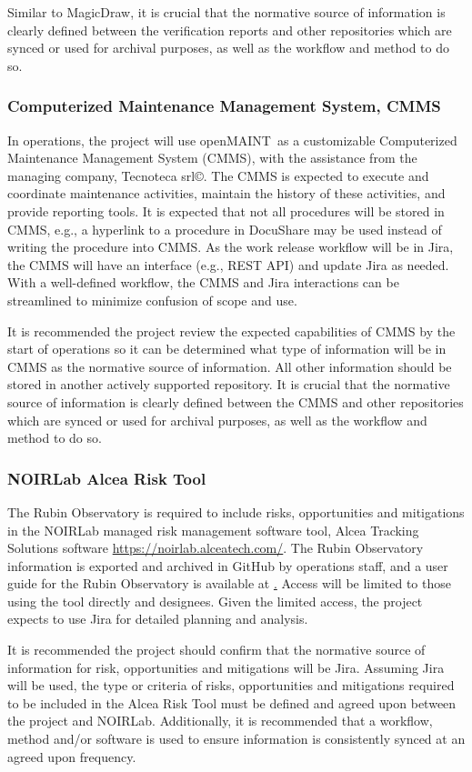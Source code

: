 Similar to MagicDraw, it is crucial that the normative source of information is clearly defined between the verification reports and other repositories which are synced or used for archival purposes, as well as the workflow and method to do so.

\subsubsection{Computerized Maintenance Management System, CMMS}

In operations, the project will use openMAINT\textregistered\ as a customizable Computerized Maintenance Management System (CMMS), with the assistance from the managing company, Tecnoteca srl\copyright . \citep{openmaint-cite}
The CMMS is expected to execute and coordinate maintenance activities, maintain the history of these activities, and provide reporting tools.
It is expected that not all procedures will be stored in CMMS, e.g., a hyperlink to a procedure in DocuShare may be used instead of writing the procedure into CMMS.
As the work release workflow will be in Jira, the CMMS will have an interface (e.g., REST API) and update Jira as needed.
With a well-defined workflow, the CMMS and Jira interactions can be streamlined to minimize confusion of scope and use.

It is recommended the project review the expected capabilities of CMMS by the start of operations so it can be determined what type of information will be in CMMS as the normative source of information.
All other information should be stored in another actively supported repository.
It is crucial that the normative source of information is clearly defined between the CMMS and other repositories which are synced or used for archival purposes, as well as the workflow and method to do so.

\subsubsection{NOIRLab Alcea Risk Tool}

The Rubin Observatory is required to include risks, opportunities and mitigations in the NOIRLab managed risk management software tool, Alcea Tracking Solutions software \url{https://noirlab.alceatech.com/}.
The Rubin Observatory information is exported and archived in GitHub by operations staff, and a user guide for the Rubin Observatory is available at \href{https://rtn-051.lsst.io/}.
Access will be limited to those using the tool directly and designees.
Given the limited access, the project expects to use Jira for detailed planning and analysis.

It is recommended the project should confirm that the normative source of information for risk, opportunities and mitigations will be Jira.
Assuming Jira will be used, the type or criteria of risks, opportunities and mitigations required to be included in the Alcea Risk Tool must be defined and agreed upon between the project and NOIRLab.
Additionally, it is recommended that a workflow, method and/or software is used to ensure information is consistently synced at an agreed upon frequency.

